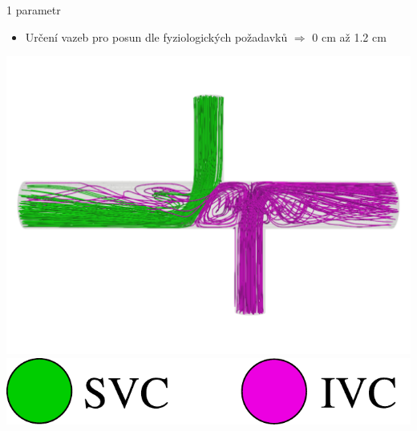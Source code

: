 \documentclass[aspectratio=169,xcolor=dvipsnames]{beamer}
\begin{document}
\begin{frame}{1 parametr}
	\begin{itemize}
		\item Určení vazeb pro posun dle fyziologických požadavků $\Rightarrow$ 0 cm až 1.2 cm
	\end{itemize}
	\begin{center}
		\includegraphics[width=0.55\linewidth, trim={0 0 0 0mm}, clip]{Images/IVCsplit.pdf}
		\centering
		\includegraphics[width=0.15\linewidth, trim={0 0 0 0mm}, clip]{Images/split-leg.pdf}
	\end{center}			
\end{frame}
\end{document}
